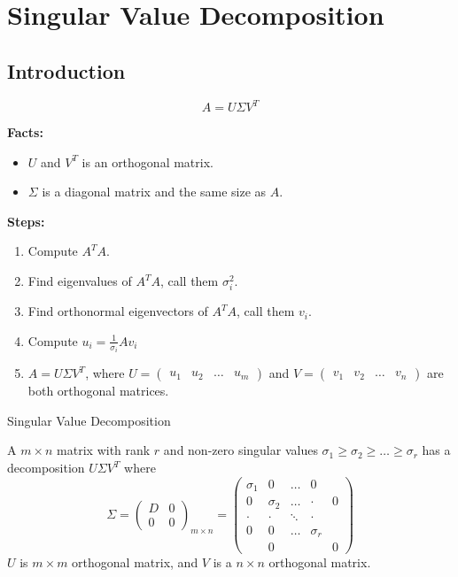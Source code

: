 \section{Singular Value Decomposition}
\subsection{Introduction}
\begin{equation}
    A = U \Sigma V^T
\end{equation}

\noindent
\newline
\textbf{Facts:}
\begin{itemize}
    \item \(U\) and \(V^T\) is an orthogonal matrix.
    \item \(\Sigma\) is a diagonal matrix and the same size as \(A\).
\end{itemize}

\noindent
\newline
\textbf{Steps:}
\begin{enumerate}
    \item Compute \(A^T A\).
    \item Find eigenvalues of \(A^T A\), call them \(\sigma_i^2\).
    \item Find orthonormal eigenvectors of \(A^T A\), call them \(v_i\).
    \item Compute \(u_i = \frac{1}{\sigma_i} A v_i\)
    \item \(A = U \Sigma V^T\), where \(U = \begin{pmatrix}
        u_1 & u_2 & \dots & u_m
    \end{pmatrix}\) and \(V = \begin{pmatrix}
        v_1 & v_2 & \dots & v_n
    \end{pmatrix}\) are both orthogonal matrices.
\end{enumerate}

\begin{theorem} Singular Value Decomposition

    A \(m\times n\) matrix with rank \(r\) and non-zero singular values \(\sigma_1 \ge \sigma_2 \ge \dots \ge \sigma_r\) has a decomposition \(U \Sigma V^T\) where
    \[\Sigma = \begin{pmatrix}
        D & 0 \\ 0 & 0
    \end{pmatrix}_{m\times n} = \begin{pmatrix}
        \sigma_1 & 0 & \dots & 0 & \\
        0 & \sigma_2 & \dots & \cdot & 0 \\
        \cdot & \cdot & \ddots & \cdot & \\
        0 & 0 & \dots & \sigma_r & \\
        & 0 & & & 0
    \end{pmatrix}\]
    \(U\) is \(m\times m\) orthogonal matrix, and \(V\) is a \(n\times n\) orthogonal matrix.
\end{theorem}

